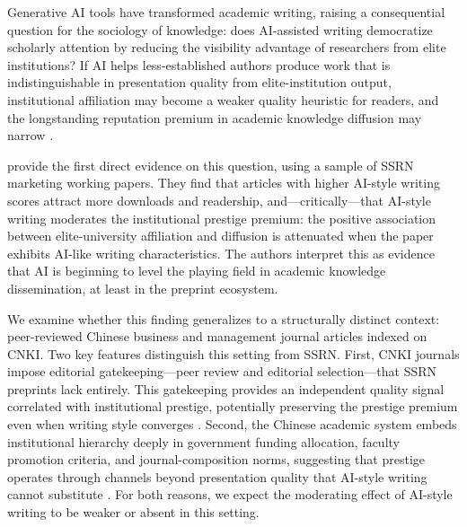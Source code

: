 \documentclass[12pt,a4paper]{article}
\begin{document}
Generative AI tools have transformed academic writing, raising a
consequential question for the sociology of knowledge: does AI-assisted
writing democratize scholarly attention by reducing the visibility
advantage of researchers from elite institutions?
If AI helps less-established authors produce work that is
indistinguishable in presentation quality from elite-institution output,
institutional affiliation may become a weaker quality heuristic for
readers, and the longstanding reputation premium in academic knowledge
diffusion may narrow
\citep{Merton1968,Spence1973,DiMaggio1983}.

\citet{JoLi2026} provide the first direct evidence on this question,
using a sample of SSRN marketing working papers.
They find that articles with higher AI-style writing scores attract
more downloads and readership, and---critically---that AI-style writing
moderates the institutional prestige premium: the positive association
between elite-university affiliation and diffusion is attenuated when
the paper exhibits AI-like writing characteristics.
The authors interpret this as evidence that AI is beginning to level
the playing field in academic knowledge dissemination, at least in the
preprint ecosystem.

We examine whether this finding generalizes to a structurally distinct
context: peer-reviewed Chinese business and management journal articles
indexed on CNKI.
Two key features distinguish this setting from SSRN.
First, CNKI journals impose editorial gatekeeping---peer review and
editorial selection---that SSRN preprints lack entirely.
This gatekeeping provides an independent quality signal correlated with
institutional prestige, potentially preserving the prestige premium
even when writing style converges \citep{Bornmann2008}.
Second, the Chinese academic system embeds institutional hierarchy
deeply in government funding allocation, faculty promotion criteria,
and journal-composition norms, suggesting that prestige operates
through channels beyond presentation quality that AI-style writing
cannot substitute \citep{DiMaggio1983,Long1979}.
For both reasons, we expect the moderating effect of AI-style writing
to be weaker or absent in this setting.
\end{document}
